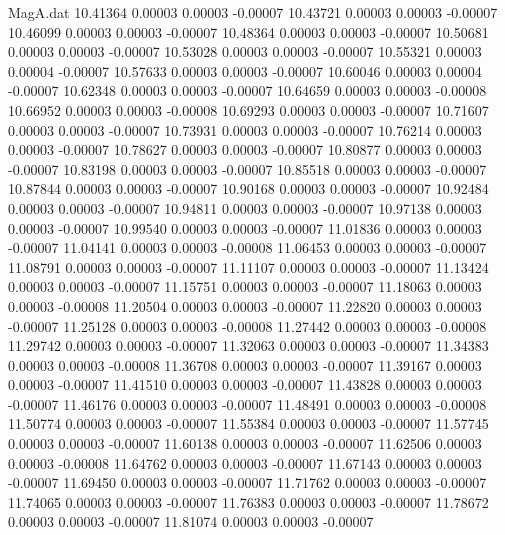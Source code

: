 \begin{filecontents}{MagA.dat}
  10.41364    0.00003    0.00003   -0.00007
  10.43721    0.00003    0.00003   -0.00007
  10.46099    0.00003    0.00003   -0.00007
  10.48364    0.00003    0.00003   -0.00007
  10.50681    0.00003    0.00003   -0.00007
  10.53028    0.00003    0.00003   -0.00007
  10.55321    0.00003    0.00004   -0.00007
  10.57633    0.00003    0.00003   -0.00007
  10.60046    0.00003    0.00004   -0.00007
  10.62348    0.00003    0.00003   -0.00007
  10.64659    0.00003    0.00003   -0.00008
  10.66952    0.00003    0.00003   -0.00008
  10.69293    0.00003    0.00003   -0.00007
  10.71607    0.00003    0.00003   -0.00007
  10.73931    0.00003    0.00003   -0.00007
  10.76214    0.00003    0.00003   -0.00007
  10.78627    0.00003    0.00003   -0.00007
  10.80877    0.00003    0.00003   -0.00007
  10.83198    0.00003    0.00003   -0.00007
  10.85518    0.00003    0.00003   -0.00007
  10.87844    0.00003    0.00003   -0.00007
  10.90168    0.00003    0.00003   -0.00007
  10.92484    0.00003    0.00003   -0.00007
  10.94811    0.00003    0.00003   -0.00007
  10.97138    0.00003    0.00003   -0.00007
  10.99540    0.00003    0.00003   -0.00007
  11.01836    0.00003    0.00003   -0.00007
  11.04141    0.00003    0.00003   -0.00008
  11.06453    0.00003    0.00003   -0.00007
  11.08791    0.00003    0.00003   -0.00007
  11.11107    0.00003    0.00003   -0.00007
  11.13424    0.00003    0.00003   -0.00007
  11.15751    0.00003    0.00003   -0.00007
  11.18063    0.00003    0.00003   -0.00008
  11.20504    0.00003    0.00003   -0.00007
  11.22820    0.00003    0.00003   -0.00007
  11.25128    0.00003    0.00003   -0.00008
  11.27442    0.00003    0.00003   -0.00008
  11.29742    0.00003    0.00003   -0.00007
  11.32063    0.00003    0.00003   -0.00007
  11.34383    0.00003    0.00003   -0.00008
  11.36708    0.00003    0.00003   -0.00007
  11.39167    0.00003    0.00003   -0.00007
  11.41510    0.00003    0.00003   -0.00007
  11.43828    0.00003    0.00003   -0.00007
  11.46176    0.00003    0.00003   -0.00007
  11.48491    0.00003    0.00003   -0.00008
  11.50774    0.00003    0.00003   -0.00007
  11.55384    0.00003    0.00003   -0.00007
  11.57745    0.00003    0.00003   -0.00007
  11.60138    0.00003    0.00003   -0.00007
  11.62506    0.00003    0.00003   -0.00008
  11.64762    0.00003    0.00003   -0.00007
  11.67143    0.00003    0.00003   -0.00007
  11.69450    0.00003    0.00003   -0.00007
  11.71762    0.00003    0.00003   -0.00007
  11.74065    0.00003    0.00003   -0.00007
  11.76383    0.00003    0.00003   -0.00007
  11.78672    0.00003    0.00003   -0.00007
  11.81074    0.00003    0.00003   -0.00007

\end{filecontents}
